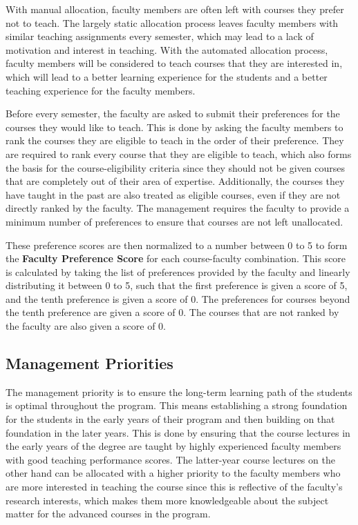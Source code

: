 With manual allocation, faculty members are often left with courses they prefer not to teach. The largely static allocation process leaves faculty members with similar teaching assignments every semester, which may lead to a lack of motivation and interest in teaching. With the automated allocation process, faculty members will be considered to teach courses that they are interested in, which will lead to a better learning experience for the students and a better teaching experience for the faculty members.

Before every semester, the faculty are asked to submit their preferences for the courses they would like to teach. This is done by asking the faculty members to rank the courses they are eligible to teach in the order of their preference. They are required to rank every course that they are eligible to teach, which also forms the basis for the course-eligibility criteria since they should not be given courses that are completely out of their area of expertise. Additionally, the courses they have taught in the past are also treated as eligible courses, even if they are not directly ranked by the faculty. The management requires the faculty to provide a minimum number of preferences to ensure that courses are not left unallocated.

These preference scores are then normalized to a number between 0 to 5 to form the \textbf{Faculty Preference Score} for each course-faculty combination. This score is calculated by taking the list of preferences provided by the faculty and linearly distributing it between 0 to 5, such that the first preference is given a score of 5, and the tenth preference is given a score of 0. The preferences for courses beyond the tenth preference are given a score of 0. The courses that are not ranked by the faculty are also given a score of 0.

\subsection{Management Priorities}

The management priority is to ensure the long-term learning path of the students is optimal throughout the program. This means establishing a strong foundation for the students in the early years of their program and then building on that foundation in the later years. This is done by ensuring that the course lectures in the early years of the degree are taught by highly experienced faculty members with good teaching performance scores. The latter-year course lectures on the other hand can be allocated with a higher priority to the faculty members who are more interested in teaching the course since this is reflective of the faculty's research interests, which makes them more knowledgeable about the subject matter for the advanced courses in the program.

